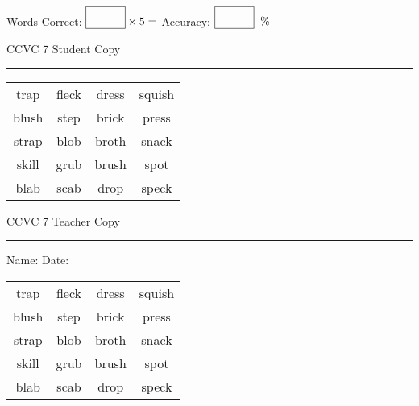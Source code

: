 \documentclass{memoir}
\begin{document}
\small

Words Correct: $\fbox{\phantom{\huge 100}} \times 5 = $ Accuracy: $\fbox{\phantom{\huge 100}}\;\; \%$ 

\vfill

\newpage


\footnotesize \noindent
CCVC 7 \hfill Student Copy
\smallskip
\hrule

\Large

\setlength{\tabcolsep}{14pt}
\def\arraystretch{3}

{\selectfont


\begin{vplace}[0.5]
\begin{center}
\begin{tabular}{cccc}
trap & fleck             & dress & squish \\
blush & step & brick       & press       \\
strap & blob & broth    & snack \\
skill & grub & brush & spot \\
blab             & scab & drop & speck \\
\end{tabular}
\end{center}
\end{vplace}

}

\newpage

\footnotesize \noindent
CCVC 7 \hfill Teacher Copy
\smallskip
\hrule

\small

\vfill

\noindent
Name: \underline{\hspace{1.75in}} \hfill Date: \underline{\hspace{1in}}

\Large

{\selectfont


\begin{vplace}[0.5]
\begin{center}
\begin{tabular}{cccc}
trap & fleck             & dress & squish \\
blush & step & brick       & press       \\
strap & blob & broth    & snack \\
skill & grub & brush & spot \\
blab             & scab & drop & speck \\
\end{tabular}
\end{center}
\end{vplace}



}
\end{document}
